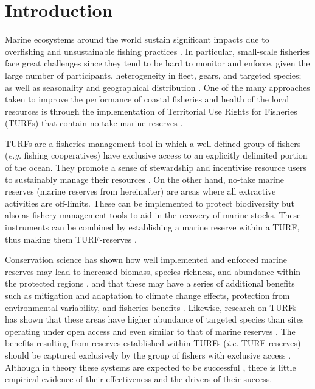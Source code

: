 \documentclass[10pt,letterpaper]{article}
\begin{document}
\clearpage

\linenumbers

\section*{Introduction}

Marine ecosystems around the world sustain significant impacts due to overfishing and unsustainable fishing practices \cite{pauly_2005-qV,worm_2006-IB,halpern_2008-dK}. In particular, small-scale fisheries face great challenges since they tend to be hard to monitor and enforce, given the large number of participants, heterogeneity in fleet, gears, and targeted species; as well as seasonality and geographical distribution \cite{costello_2012,jacquet_2008}. One of the many approaches taken to improve the performance of coastal fisheries and health of the local resources is through the implementation of Territorial Use Rights for Fisheries (TURFs) that contain no-take marine reserves \cite{afflerbach_2014,gelcich_2015,lester_2017}.

TURFs are a fisheries management tool in which a well-defined group of fishers (\emph{e.g.} fishing cooperatives) have exclusive access to an explicitly delimited portion of the ocean. They promote a sense of stewardship and incentivise resource users to sustainably manage their resources \cite{gelcich_2008,costello_2010,mccay_2014}. On the other hand, no-take marine reserves (marine reserves from hereinafter) are areas where all extractive activities are off-limits. These can be implemented to protect biodiversity but also as fishery management tools to aid in the recovery of marine stocks. These instruments can be combined by establishing a marine reserve within a TURF, thus making them TURF-reserves \cite{afflerbach_2014,gelcich_2015,lester_2017}.

Conservation science has shown how well implemented and enforced marine reserves may lead to increased biomass, species richness, and abundance within the protected regions \cite{halpern_2002,lester_2009}, and that these may have a series of additional benefits such as mitigation and adaptation to climate change effects, protection from environmental variability, and fisheries benefits \cite{roberts_2017-J9,micheli_2012-EU,krueck_2017-J1}. Likewise, research on TURFs has shown that these areas have higher abundance of targeted species than sites operating under open access and even similar to that of marine reserves \cite{gelcich_2008,gelcich_2012}. The benefits resulting from reserves established within TURFs (\emph{i.e.} TURF-reserves) should be captured exclusively by the group of fishers with exclusive access \cite{gelcich_2015}. Although in theory these systems are expected to be successful \cite{smallhornwest_2018}, there is little empirical evidence of their effectiveness and the drivers of their success.
\end{document}
